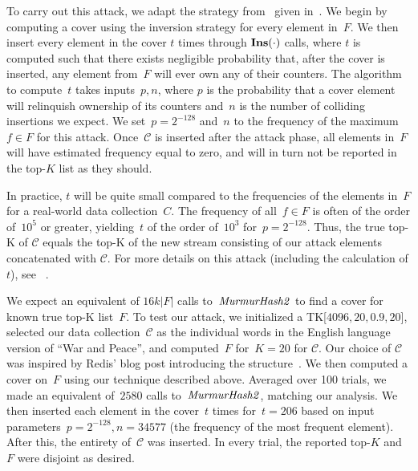 To carry out this attack, we adapt the strategy from~\cite{markelon23} given in~. We begin by computing a cover using the inversion strategy for every element in~$F$. We then insert every element in the cover $t$ times through $\textbf{Ins}(\cdot)$ calls, where 
$t$ is computed such that there exists negligible probability that, after the cover is inserted, any element from~$F$ will ever own any of their counters. The algorithm to compute~$t$ takes inputs~$p,n$, where $p$ is the probability that a cover element will relinquish ownership of its counters and~$n$ is the number of colliding insertions we expect. We set~$p=2^{-128}$ and~$n$ to the frequency of the maximum~$f \in F$ for this attack. Once~$\mathcal{C}$ is inserted after the attack phase, all elements in~$F$ will have estimated frequency equal to zero, and will in turn not be reported in the top-$K$ list as they should.

In practice, $t$ will be quite small compared to the frequencies of the elements in~$F$ for a real-world data collection~$C$. The frequency of all~$f \in F$ is often of the order of~$10^5$ or greater, yielding~$t$ of the order of~$10^3$ for~$p=2^{-128}$.  Thus, the true top-K of $\mathcal{C}$ equals the top-K of the new stream consisting of our attack elements concatenated with $\mathcal{C}$. For more details on this attack (including the calculation of $t$), see ~.

We expect an equivalent of $16k|F|$ calls to~$\mathit{MurmurHash2}$ to find a cover for known true top-K list~$F$. To test our attack, we initialized a TK[$4096, 20, 0.9, 20$], selected our data collection~$\mathcal{C}$ as the individual words in the English language version of ``War and Peace'', and computed~$F$ for~$K{=}20$ for $\mathcal{C}$. Our choice of $\mathcal{C}$ was inspired by Redis' blog post introducing the structure~\cite{redisblogtopK}. 
We then computed a cover on~$F$ using our technique described above. Averaged over 100 trials, we made an equivalent of~$2580$ calls to~$\mathit{MurmurHash2}$, matching our analysis. We then inserted each element in the cover~$t$ times for~$t{=}206$ based on input parameters~$p{=}2^{-128}, n{=}34577$ (the frequency of the most frequent element). After this, the entirety of~$\mathcal{C}$ was inserted. In every trial, the reported top-$K$ and $F$ were disjoint as desired. 


